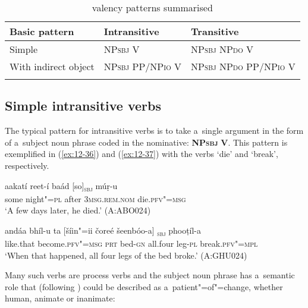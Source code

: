 \begin{table}[ht]
\caption{valency patterns summarised}

\begin{tabularx}{\textwidth}{ Q Q Q }
\lsptoprule
Basic pattern &
Intransitive &
Transitive\\\hline
Simple &
NP\textsc{sbj} V &
NP\textsc{sbj} NP\textsc{do} V\\
With indirect object &
NP\textsc{sbj} PP/NP\textsc{io} V &
NP\textsc{sbj} NP\textsc{do} PP/NP\textsc{io} V\\\lspbottomrule
\end{tabularx}
\label{tab:12-2}
\end{table}


\subsection{Simple intransitive verbs}
\label{subsec:12-2-2}


The typical pattern for intransitive verbs is to take a~single argument in the form of a~subject noun phrase coded in the nominative: \textbf{NP\textsc{sbj}} \textbf{V}. This pattern is exemplified in (\ref{ex:12-36}) and (\ref{ex:12-37}) with the verbs `die' and `break', respectively.

\begin{exe}
\ex
\label{ex:12-36}
\gll aakatí reet-í baád [so]\textsubscript{\textsc{sbj}} múṛ-u \\
some night"=\textsc{pl} after \textsc{3msg.rem.nom} die.\textsc{pfv"=msg} \\
\glt `A few days later, he died.' (A:ABO024)
\end{exe}
\begin{exe}
\ex
\label{ex:12-37}
\gll andáa bhíl-u ta [šíin"=ii čoreé šeenbóo-a]\textsubscript{\textsc{ sbj}} phooṭíl-a \\
like.that become.\textsc{pfv"=msg} \textsc{prt} bed-\textsc{gn} all.four leg-\textsc{pl}  break.\textsc{pfv"=mpl}\\
\glt `When that happened, all four legs of the bed broke.' (A:GHU024)
\end{exe}

Many such verbs are process verbs and the subject noun phrase has a~semantic role that (following \citealt[125]{givon2001a}) could be described as a~patient"=of"=change, whether human, animate or inanimate:


